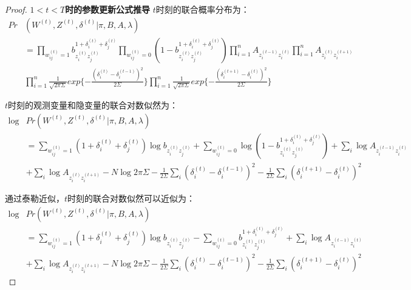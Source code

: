 \begin{proof}
	\textbf{$1<t<T$时的参数更新公式推导}
	$t$时刻的联合概率分布为：
	\begin{equation}
		\begin{split}
			Pr&(W^{(t)},Z^{(t)},\delta^{(t)}|\pi,B,A,\lambda) \\
			& =\prod_{w_{ij}^{(t)}=1} b_{z_i^{(t)} z_j^{(t)}}^{1+\delta_i^{(t)}+\delta_j^{(t)}}  \prod_{w_{ij}^{(t)}=0} (1-b_{z_i^{(t)} z_j^{(t)}}^{1+\delta_i^{(t)}+\delta_j^{(t)}}) \prod_{i=1}^{n} A_{z_i^{(t-1)} z_i^{(t)}} \prod_{i=1}^{n} A_{z_i^{(t)} z_i^{(t+1)}}  \\
			&  \prod_{i=1}^{n} \frac{1}{\sqrt{2\pi \Sigma}} exp\{-\frac{(\delta_i^{(t)}-\delta_i^{(t-1)})^2}{2\Sigma}\} \prod_{i=1}^{n} \frac{1}{\sqrt{2\pi \Sigma}} exp\{-\frac{(\delta_i^{(t+1)}-\delta_i^{(t)})^2}{2\Sigma}\}
		\end{split}
	\end{equation}
	
	$t$时刻的观测变量和隐变量的联合对数似然为：
	\begin{equation}
		\begin{split}
			\log &Pr(W^{(t)},Z^{(t)},\delta^{(t)}|\pi,B,A,\lambda)  \\
			&  =\sum_{w_{ij}^{(t)}=1} (1+\delta_i^{(t)}+\delta_j^{(t)}) \log b_{z_i^{(t)} z_j^{(t)}} +\sum_{w_{ij}^{(t)}=0} \log (1-b_{z_i^{(t)} z_j^{(t)}}^{1+\delta_i^{(t)}+\delta_j^{(t)}})+\sum_{i} \log A_{z_i^{(t-1)} z_i^{(t)}}   \\
			&  +\sum_{i} \log A_{z_i^{(t)} z_i^{(t+1)}} -N \log 2 \pi \Sigma -\frac{1}{2\Sigma} \sum_{i} (\delta_i^{(t)}-\delta_i^{(t-1)})^2-\frac{1}{2\Sigma} \sum_{i} (\delta_i^{(t+1)}-\delta_i^{(t)})^2
		\end{split}
	\end{equation}
	
	通过泰勒近似，$t$时刻的联合对数似然可以近似为：
	\begin{equation}
		\begin{split}
			\log &Pr(W^{(t)},Z^{(t)},\delta^{(t)}|\pi,B,A,\lambda)  \\
			&  =\sum_{w_{ij}^{(t)}=1} (1+\delta_i^{(t)}+\delta_j^{(t)}) \log b_{z_i^{(t)} z_j^{(t)}} -\sum_{w_{ij}^{(t)}=0} b_{z_i^{(t)} z_j^{(t)}}^{1+\delta_i^{(t)}+\delta_j^{(t)}}+\sum_{i} \log A_{z_i^{(t-1)} z_i^{(t)}}   \\
			&  +\sum_{i} \log A_{z_i^{(t)} z_i^{(t+1)}} -N \log 2 \pi \Sigma -\frac{1}{2\Sigma} \sum_{i} (\delta_i^{(t)}-\delta_i^{(t-1)})^2 -\frac{1}{2\Sigma} \sum_{i} (\delta_i^{(t+1)}-\delta_i^{(t)})^2
		\end{split}
	\end{equation}
	

\end{proof}
